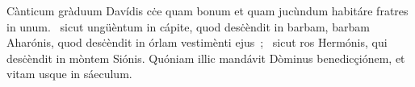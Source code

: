 { Cànticum gràduum Davídis}
{%
cċe quam bonum et quam jucùndum habitáre fratres in unum. 
~sicut ungüèntum in cápite, quod desċèndit in barbam, barbam Aharónis, quod desċèndit in órlam vestimènti ejus~; 
~sicut ros Hermónis, qui desċèndit in mòntem Siónis. Quóniam illic mandávit Dòminus benedicçiónem, et vitam usque in sáeculum. 
}
